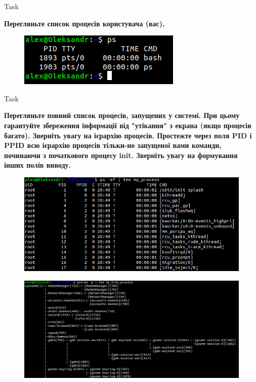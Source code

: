 \documentclass[a4paper,12pt]{article}
\newcommand{\RomanNumeralCaps}[1]{\MakeUppercase{\romannumeral #1}}
\begin{document}
\newpage
    \begin{center}
        \Large{Task \RomanNumeralCaps{1}}
    \end{center}
    \textbf{Перегляньте список процесів користувача (вас).}
    \begin{figure}[h!]
        \begin{minipage}[h]{1\linewidth}
            \centering
            \includegraphics[width=0.6\linewidth]{Prt sc/Figure_1.png}  
        \end{minipage}
    \end{figure}
    \begin{center}
        \Large{Task \RomanNumeralCaps{2}}
    \end{center}
    \textbf{Перегляньте повний список процесів, запущених у системі. При цьому гарантуйте збереження інформації від
    "утікання" з екрана (якщо процесів багато). Зверніть увагу на ієрархію процесів. Простежте через поля PID і PPID всю
    ієрархію процесів тільки-но запущеної вами команди, починаючи з початкового процесу init. Зверніть увагу на
    формування інших полів виводу.}
    \begin{figure}[h!]
        \begin{minipage}[h]{1\linewidth}
            \centering
            \includegraphics[width=0.8\linewidth]{Prt sc/Figure_2_1.png}  
        \end{minipage}
    \end{figure}
    \begin{figure}[h!]
        \begin{minipage}[h]{1\linewidth}
            \centering
            \includegraphics[width=0.8\linewidth]{Prt sc/Figure_2_2.png}  
        \end{minipage}
    \end{figure}
\end{document}
